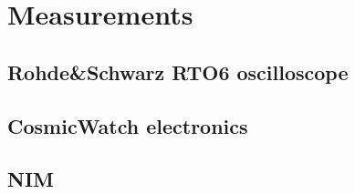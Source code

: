 \chapter{Measurements}

\section{Rohde\&Schwarz RTO6 oscilloscope}

\section{CosmicWatch electronics}

\section{NIM}